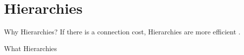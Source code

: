 \section{Hierarchies}


\begin{frame}[c]{Why Hierarchies?}
    \Large
    If there is a connection cost, Hierarchies are more efficient \cite{mengistu2016evolutionary}.
\end{frame}

\begin{frame}[c]{What Hierarchies}
    
\end{frame}




